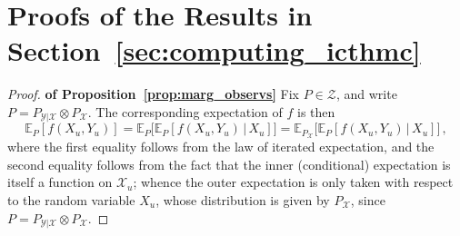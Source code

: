 \documentclass[3p]{elsarticle}
\newcommand{\states}{\mathcal{X}}
\newcommand{\observs}{\mathcal{Y}}
\begin{document}
\section{Proofs of the Results in Section~\ref{sec:computing_icthmc}}

\begin{proof}{\bf of Proposition~\ref{prop:marg_observs}}
Fix $P\in\mathcal{Z}$, and write $P=P_{\observs\vert\states}\otimes P_\states$. The corresponding expectation of $f$ is then
\begin{equation}\label{eq:prop_marg_observs_decomp}
\mathbb{E}_P[f(X_u,Y_u)] = \mathbb{E}_P\bigl[\mathbb{E}_P[f(X_u,Y_u)\,\vert\,X_u]\bigr] = \mathbb{E}_{P_\states}\bigl[\mathbb{E}_P[f(X_u,Y_u)\,\vert\,X_u]\bigr]\,,
\end{equation}
where the first equality follows from the law of iterated expectation, and the second equality follows from the fact that the inner (conditional) expectation is itself a function on $\states_u$; whence the outer expectation is only taken with respect to the random variable $X_u$, whose distribution is given by $P_\states$, since $P=P_{\observs\vert\states}\otimes P_\states$.


\end{proof}
\end{document}
